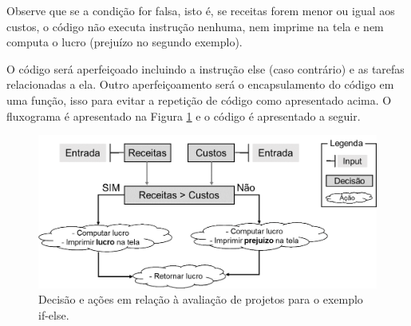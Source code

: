 \documentclass[
  11pt,
  a5paper,
  openany]{book}
\newenvironment{Shaded}{\begin{snugshade}}{\end{snugshade}}
\newcommand{\CommentTok}[1]{\textcolor[rgb]{0.56,0.35,0.01}{\textit{#1}}}
\newcommand{\ControlFlowTok}[1]{\textcolor[rgb]{0.13,0.29,0.53}{\textbf{#1}}}
\newcommand{\DecValTok}[1]{\textcolor[rgb]{0.00,0.00,0.81}{#1}}
\newcommand{\KeywordTok}[1]{\textcolor[rgb]{0.13,0.29,0.53}{\textbf{#1}}}
\newcommand{\NormalTok}[1]{#1}
\newcommand{\OperatorTok}[1]{\textcolor[rgb]{0.81,0.36,0.00}{\textbf{#1}}}
\newcommand{\StringTok}[1]{\textcolor[rgb]{0.31,0.60,0.02}{#1}}
\begin{document}
Observe que se a condição for falsa, isto é, se receitas forem menor ou igual aos custos, o código não executa instrução nenhuma, nem imprime na tela e nem computa o lucro (prejuízo no segundo exemplo).

\begin{Shaded}
\end{Shaded}

O código será aperfeiçoado incluindo a instrução else (caso contrário) e as tarefas relacionadas a ela. Outro aperfeiçoamento será o encapsulamento do código em uma função, isso para evitar a repetição de código como apresentado acima. O fluxograma é apresentado na Figura \ref{fig:FigCond4} e o código é apresentado a seguir.

\begin{figure}

{\centering \includegraphics[width=1\linewidth]{images/Fig_Cond4} 

}

\caption{Decisão e ações em relação à avaliação de projetos para o exemplo if-else.}\label{fig:FigCond4}
\end{figure}
\end{document}
